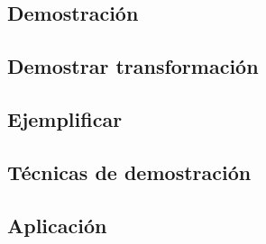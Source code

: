\subsection{Demostración}


\subsection{Demostrar transformación}


\subsection{Ejemplificar}


\subsection{Técnicas de demostración}


\subsection{Aplicación}

